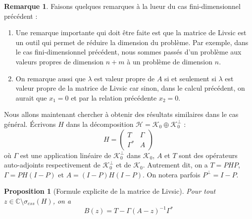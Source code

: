 \documentclass[12pt,openany,a4paper, titlepage]{article}
\newcommand{\C}{\mathbb{C}}
\newcommand{\HH}{\mathcal{H}}
\newtheorem{prop}{Proposition}
\theoremstyle{definition}
\theoremstyle{definition}
\theoremstyle{definition}
\theoremstyle{definition}
\theoremstyle{definition}
\newtheorem{rem}{Remarque}
\theoremstyle{definition}
\begin{document}
\begin{rem}
Faisons quelques remarques à la lueur du cas fini-dimensionnel précédent :
\begin{enumerate}
    \item Une remarque importante qui doit être faite est que la matrice de Livsic est un outil qui permet de réduire la dimension du problème. Par exemple, dans le cas fini-dimensionnel précédent, nous sommes passés d'un problème aux valeurs propres de dimension $n+m$ à un problème de dimension $n$.
    \item On remarque aussi que $\lambda$ est valeur propre de $A$ si et seulement si $\lambda$ est valeur propre de la matrice de Livsic car sinon, dans le calcul précédent, on aurait que $x_1 = 0$ et par la relation précédente $x_2 = 0$.
\end{enumerate}
 
Nous allons maintenant chercher à obtenir des résultats similaires dans le cas général. Écrivons $H$ dans la décomposition $\HH = \mathcal{K}_0 \oplus \mathcal{K}_0^\perp$ :
\begin{equation}
    H = \begin{pmatrix}
        T & \Gamma \\
        \Gamma^* & A 
\end{pmatrix}
\end{equation}
où $\Gamma$ est une application linéaire de $\mathcal{K}_0^\perp$ dans $\mathcal{K}_0$, $A$ et $T$ sont des opérateurs auto-adjoints respectivement de $\mathcal{K}_0^\perp$ et de $\mathcal{K}_0$. Autrement dit, on a $T = PHP$, $\Gamma = PH(I-P)$ et $A = (I-P)H(I-P)$. On notera parfois $P^\perp = I - P$.

\begin{prop}[Formule explicite de la matrice de Livsic]\label{formulue_liv}
Pour tout $z\in\C\setminus\sigma_{ess}(H)$, on a 
\begin{equation}
    B(z) = T - \Gamma(A -z)^{-1}\Gamma^*
\end{equation}
\end{prop}


\end{rem}
\end{document}
